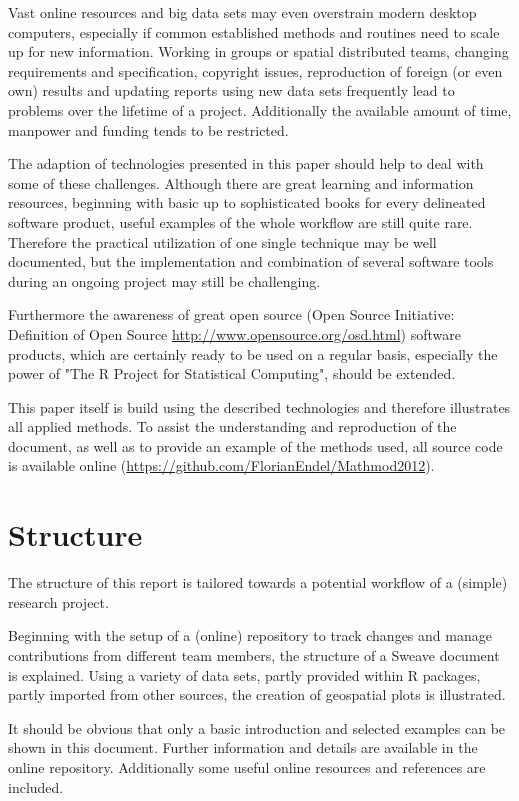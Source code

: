 \documentclass{ifacconf}
\begin{document}
Vast online resources and big data sets may even overstrain
modern desktop computers, especially if common established methods
and routines need to scale up for new information. 
Working in groups or spatial distributed teams,  
changing requirements and specification, copyright issues, reproduction of 
foreign (or even own) results  and updating reports using new data sets frequently
lead to problems over the lifetime of a project. 
Additionally the available amount of time, manpower and funding tends to be restricted.

The adaption of technologies presented in this paper should help to deal with
some of these challenges. Although there are great learning and information resources, 
beginning with 
basic up to sophisticated books for every delineated software product,
useful examples of the whole workflow are still quite rare. Therefore the 
practical utilization of one single technique may be well documented, but
the implementation and combination of several software tools during an ongoing
project may still be challenging.

Furthermore the awareness of great open source
(Open Source Initiative: Definition of Open Source \url{http://www.opensource.org/osd.html}) 
software products, which are 
certainly ready to be used on a regular basis, especially the power of "The R Project
for Statistical Computing", should be extended.

This paper itself is build using the described technologies and therefore illustrates 
all applied methods. To assist the understanding and reproduction of the document, 
as well as to provide an example of the methods used, all source code is available 
online (\url{https://github.com/FlorianEndel/Mathmod2012}).

\section{Structure}
The structure of this report is tailored towards a potential workflow of a (simple)
research project. 

Beginning with the setup of a (online) repository to track changes and manage 
contributions from different team members, the structure of a Sweave document is
explained. Using a variety of data sets, partly provided within R packages, partly
imported from other sources, the creation of geospatial plots is illustrated. 

It should be obvious that only a basic introduction and selected examples 
can be shown in this document. Further information and details 
are available in the online repository.
Additionally some useful online resources and references are included.
\end{document}
